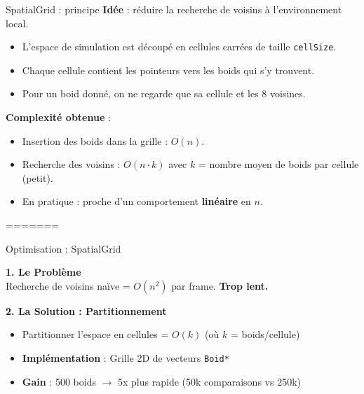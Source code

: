 \documentclass[aspectratio=169]{beamer}
\begin{document}
\begin{frame}{SpatialGrid : principe}
  \textbf{Idée} : réduire la recherche de voisins à l'environnement local.
  \begin{itemize}
    \item L'espace de simulation est découpé en cellules carrées de taille \texttt{cellSize}.
    \item Chaque cellule contient les pointeurs vers les boids qui s’y trouvent.
    \item Pour un boid donné, on ne regarde que sa cellule et les 8 voisines.
  \end{itemize}

  \vspace{0.4cm}
  \textbf{Complexité obtenue} :
  \begin{itemize}
    \item Insertion des boids dans la grille : \(O(n)\).
    \item Recherche des voisins : \(O(n \cdot k)\) avec \(k\) = nombre moyen de boids par cellule (petit).
    \item En pratique : proche d’un comportement \textbf{linéaire} en \(n\).
  \end{itemize}
\end{frame}
=======
\begin{frame}{Optimisation : SpatialGrid}

\vspace{0.5cm}

\textbf{\large 1. Le Problème} \\
Recherche de voisins naïve = $O(n^2)$ par frame. \textbf{Trop lent.}

\vspace{1cm}

\textbf{\large 2. La Solution : Partitionnement}
\begin{itemize}
    \setlength\itemsep{0.5em}
    \item Partitionner l'espace en cellules = $O(k)$ (où $k$ = boids/cellule)
    \item \textbf{Implémentation} : Grille 2D de vecteurs \texttt{Boid*}
    \item \textbf{Gain} : 500 boids $\rightarrow$ 5x plus rapide (50k comparaisons vs 250k)
\end{itemize}

\end{frame}
\end{document}
